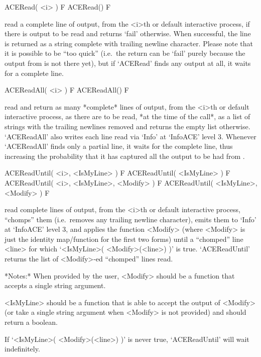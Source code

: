 \>ACERead( <i> ) F
\>ACERead() F

read a complete line of {\ACE}  output,  from  the  <i>th  or  default
interactive {\ACE} process, if there is output to be read and  returns
`fail' otherwise. When successful, the line is returned  as  a  string
complete with trailing newline  character.  Please  note  that  it  is
possible to be ``too quick'' (i.e.~the return  can  be  `fail'  purely
because the output from {\ACE} is not there  yet),  but  if  `ACERead'
finds any output at all, it waits for a complete line.

\>ACEReadAll( <i> ) F
\>ACEReadAll() F

read and return as many *complete* lines of {\ACE}  output,  from  the
<i>th or default interactive {\ACE} process, as there are to be  read,
*at the time of the call*, as a list  of  strings  with  the  trailing
newlines removed and returns the empty  list  otherwise.  `ACEReadAll'
also writes each line read via `Info' at `InfoACE' level  3.  Whenever
`ACEReadAll' finds only a partial line,  it  waits  for  the  complete
line, thus increasing the probability that it  has  captured  all  the
output to be had from {\ACE}.

\>ACEReadUntil( <i>, <IsMyLine> ) F
\>ACEReadUntil( <IsMyLine> ) F
\>ACEReadUntil( <i>, <IsMyLine>, <Modify> ) F
\>ACEReadUntil( <IsMyLine>, <Modify> ) F

read complete lines of  {\ACE}  output,  from  the  <i>th  or  default
interactive {\ACE} process, ``chomps'' them (i.e.~removes any trailing
newline character), emits them to `Info' at  `InfoACE'  level  3,  and
applies the function <Modify> (where <Modify>  is  just  the  identity
map/function for the first two forms) until a ``chomped'' line  <line>
for which `<IsMyLine>( <Modify>(<line>)  )'  is  true.  `ACEReadUntil'
returns the list of <Modify>-ed ``chomped'' lines read.

*Notes:* 
When provided by the user, <Modify> should be a function that  accepts
a single string argument.

<IsMyLine> should be a function that is able to accept the  output  of
<Modify> (or take a  single  string  argument  when  <Modify>  is  not
provided) and should return a boolean.

If `<IsMyLine>( <Modify>(<line>) )' is never true, `ACEReadUntil' will
wait indefinitely.

